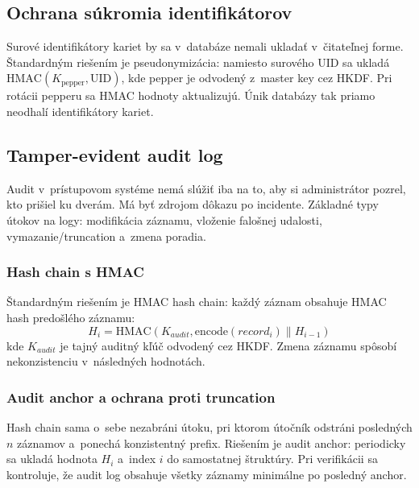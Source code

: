 
\subsection{Ochrana súkromia identifikátorov}

Surové identifikátory kariet by sa v~databáze nemali ukladať v~čitateľnej forme. Štandardným riešením je pseudonymizácia: namiesto surového UID sa ukladá $\text{HMAC}(K_{\text{pepper}}, \text{UID})$, kde pepper je odvodený z~master key cez HKDF\cite{RFC5869}. Pri rotácii pepperu sa HMAC hodnoty aktualizujú. Únik databázy tak priamo neodhalí identifikátory kariet\cite{ISO27001}.


\subsection{Tamper-evident audit log}

Audit v~prístupovom systéme nemá slúžiť iba na to, aby si administrátor pozrel, kto prišiel ku dverám. Má byť zdrojom dôkazu po incidente\cite{SchneierKelsey1999,NIST80092}. Základné typy útokov na logy: modifikácia záznamu, vloženie falošnej udalosti, vymazanie/truncation a~zmena poradia.

\subsubsection{Hash chain s HMAC}

Štandardným riešením je HMAC hash chain\cite{SchneierKelsey1999}: každý záznam obsahuje HMAC hash predošlého záznamu:
\begin{equation}
H_i = \mathrm{HMAC}(K_{audit}, \mathrm{encode}(record_i) \parallel H_{i-1})
\end{equation}
kde $K_{audit}$ je tajný auditný kľúč odvodený cez HKDF. Zmena záznamu spôsobí nekonzistenciu v~následných hodnotách.

\subsubsection{Audit anchor a ochrana proti truncation}

Hash chain sama o~sebe nezabráni útoku, pri ktorom útočník odstráni posledných $n$ záznamov a~ponechá konzistentný prefix. Riešením je audit anchor: periodicky sa ukladá hodnota $H_i$ a~index $i$ do samostatnej štruktúry. Pri verifikácii sa kontroluje, že audit log obsahuje všetky záznamy minimálne po posledný anchor.

